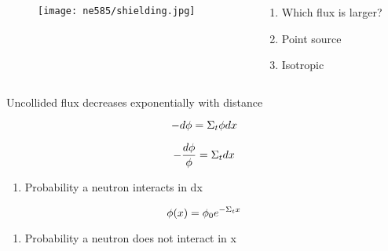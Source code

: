 \documentclass[aspectratio=1610,pdftex,dvipsnames,compress,xcolor={dvipsnames}]{beamer}
\begin{document}
\addtocounter{framenumber}{-1} 
\begin{frame}{}
    \begin{columns}

        \begin{column}{0.75\textwidth}
            \begin{figure}
                \centering
                \texttt{[image: ne585/shielding.jpg]}
            \end{figure}
        \end{column}

        \begin{column}{0.25\textwidth}
            \begin{enumerate}[series=outerlist,topsep=0pt,itemsep=7pt,leftmargin=*,label=(\arabic*)]
                \item[]\small Which flux is larger?
                \item[]\small Point source
                \item[]\small Isotropic
            \end{enumerate}
        \end{column}

    \end{columns}
\end{frame}


\begin{frame}{Uncollided flux decreases exponentially with distance}

    \begin{equation}
        \LARGE
        -d\phi = \Sigma_t \phi dx
    \end{equation}

    \vspace*{\fill}

    \begin{equation}
        \LARGE
        -\frac{d\phi}{\phi} = \Sigma_t dx
    \end{equation}

    \vspace*{\fill}

    \begin{enumerate}[series=outerlist,topsep=0pt,itemsep=11pt,leftmargin=*,label=(\arabic*)]
        \item[]Probability a neutron interacts in dx
    \end{enumerate}

    \vspace*{\fill}

    \begin{equation}
        \LARGE
        \phi(x) = \phi_0 e^{-\Sigma_t x}
    \end{equation}

    \vspace*{\fill}

    \begin{enumerate}[series=outerlist,topsep=0pt,itemsep=11pt,leftmargin=*,label=(\arabic*)]
        \item[]Probability a neutron does not interact in x
    \end{enumerate}
\end{frame}
\end{document}
